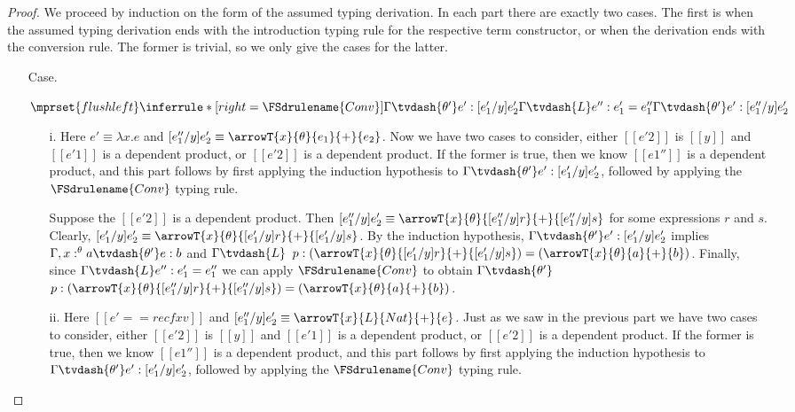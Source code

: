 \begin{proof}
  We proceed by induction on the form of the assumed typing
  derivation.  In each part there are exactly two cases.  The first is
  when the assumed typing derivation ends with the introduction typing
  rule for the respective term constructor, or when the derivation
  ends with the conversion rule.  The former is trivial, so we only
  give the cases for the latter.
  \begin{itemize}    
  \item[Case.]\ \\
    \begin{center}
      \begin{math}
        $$\mprset{flushleft}
        \inferrule* [right=\FSdrulename{Conv}] {
          \Gamma \tvdash{\theta'} e':[e'_1/y]e'_2
          \\\\
          \Gamma \tvdash{L} e'':e'_1 = e''_1
        }{\Gamma \tvdash{\theta'} e':[e''_1/y]e'_2}
      \end{math}
    \end{center}
    \begin{itemize}
    \item[i.] 
      Here $e' \equiv \lambda x.e$ and $[e''_1/y]e'_2 \equiv \arrowT{x}{\theta}{e_1}{+}{e_2}$.  Now we have two cases to
      consider, either $[[e'2]]$ is $[[y]]$ and $[[e'1]]$ is a
      dependent product, or $[[e'2]]$ is a dependent product.  If the
      former is true, then we know $[[e1'']]$ is a dependent product,
      and this part follows by first applying the induction hypothesis
      to $\Gamma \tvdash{\theta'} e':[e'_1/y]e'_2$, followed by
      applying the $\FSdrulename{Conv}$ typing rule.

      Suppose the $[[e'2]]$ is a dependent product. Then
      $[e''_1/y]e'_2 \equiv
      \arrowT{x}{\theta}{[e''_1/y]r}{+}{[e''_1/y]s}$ for some
      expressions $r$ and $s$.  Clearly, $[e'_1/y]e'_2 \equiv
      \arrowT{x}{\theta}{[e'_1/y]r}{+}{[e'_1/y]s}$.  By the induction
      hypothesis, $\Gamma \tvdash{\theta'} e':[e'_1/y]e'_2$ implies
      $\Gamma,x:^\theta a \tvdash{\theta'} e:b$ and $\Gamma \tvdash{L}
      $ $p:(\arrowT{x}{\theta}{[e'_1/y]r}{+}{[e'_1/y]s}) =
      (\arrowT{x}{\theta}{a}{+}{b})$.  Finally, since $\Gamma
      \tvdash{L} e'':e'_1 = e''_1$ we can apply $\FSdrulename{Conv}$
      to obtain $\Gamma \tvdash{\theta'} $
      $p:(\arrowT{x}{\theta}{[e''_1/y]r}{+}{[e''_1/y]s}) =
      (\arrowT{x}{\theta}{a}{+}{b})$.

    \item[ii.] Here $[[e' == rec f x v]]$ and $[e''_1/y]e'_2 \equiv \arrowT{x}{L}{Nat}{+}{e}$.  
      Just as we saw in the previous part we have two cases to consider, either $[[e'2]]$ is $[[y]]$ and $[[e'1]]$ is a
      dependent product, or $[[e'2]]$ is a dependent product.  If the
      former is true, then we know $[[e1'']]$ is a dependent product,
      and this part follows by first applying the induction hypothesis
      to $\Gamma \tvdash{\theta'} e':[e'_1/y]e'_2$, followed by
      applying the $\FSdrulename{Conv}$ typing rule.



\end{itemize}
\end{itemize}
\end{proof}
